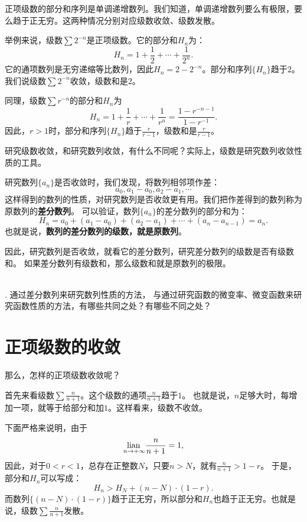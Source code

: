 \documentclass[12pt,UTF8]{ctexbook}
\begin{document}
正项级数的部分和序列是单调递增数列。我们知道，单调递增数列要么有极限，要么趋于正无穷。这两种情况分别对应级数收敛、级数发散。

举例来说，级数$\sum 2^{-n}$是正项级数。它的部分和$H_n$为：
$$ H_n = 1 + \frac{1}{2} + \cdots + \frac{1}{2^n}.$$
它的通项数列是无穷递缩等比数列，因此$H_n = 2 - 2^{-n}$。部分和序列$\{H_n\}$趋于$2$。
我们说级数$\sum 2^{-n}$收敛，级数和是$2$。

同理，级数$\sum r^{-n}$的部分和$H_n$为
$$ H_n = 1 + \frac{1}{r} + \cdots + \frac{1}{r^n} = \frac{1 - r^{-n-1}}{1 - r^{-1}}.$$
因此，$r>1$时，部分和序列$\{H_n\}$趋于$\frac{r}{r - 1}$，级数和是$\frac{r}{r - 1}$。

研究级数收敛，和研究数列收敛，有什么不同呢？实际上，级数是研究数列收敛性质的工具。

研究数列$\{a_n\}$是否收敛时，我们发现，将数列相邻项作差：
$$ a_0, a_1 - a_0, a_2 - a_1, \cdots $$
这样得到的数列的性质，对研究数列是否收敛更有用。我们把作差得到的数列称为原数列的\textbf{差分数列}。
可以验证，数列$\{a_n\}$的差分数列的部分和为：
$$ H_n = a_0 + (a_1 - a_0) + (a_2 - a_1) + \cdots + (a_n - a_{n-1}) = a_n. $$
也就是说，\textbf{数列的差分数列的级数，就是原数列}。

因此，研究数列是否收敛，就看它的差分数列，研究差分数列的级数是否有级数和。
如果差分数列有级数和，那么级数和就是原数列的极限。

\begin{sk}
    \mbox{} \\
    . 通过差分数列来研究数列性质的方法，
    与通过研究函数的微变率、微变函数来研究函数性质的方法，有哪些共同之处？有哪些不同之处？
\end{sk}

\section{正项级数的收敛}
那么，怎样的正项级数收敛呢？

首先来看级数$\sum \frac{n}{n+1}$。这个级数的通项$\frac{n}{n+1}$趋于$1$。
也就是说，$n$足够大时，每增加一项，就等于给部分和加$1$。这样看来，级数不收敛。

下面严格来说明，由于
$$\underset{n\to +\infty }{\operatorname{lian}\,}\frac{n}{n+1} = 1,$$
因此，对于$0<r<1$，总存在正整数$N$，只要$n>N$，就有$\frac{n}{n+1} > 1 - r$。
于是，部分和$H_n$可以写成：
$$ H_n > H_N + (n - N) \cdot (1 - r).$$
而数列$\{(n - N) \cdot (1 - r)\}$趋于正无穷，所以部分和$H_n$也趋于正无穷。也就是说，级数$\sum \frac{n}{n+1}$发散。
\end{document}
